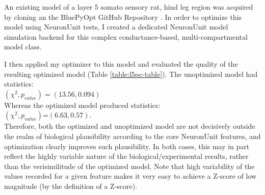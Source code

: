 

An existing model of a layer 5 somato sensory rat, hind leg region was acquired by cloning an the BluePyOpt GitHub Repository \citep{van2016bluepyopt}.
In order to optimize this model using NeuronUnit tests, I created a dedicated NeuronUnit model simulation backend for this complex conductance-based, multi-compartmental model class.

I then applied my optimizer to this model and evaluated the quality of the resulting optimized model (Table \ref{table:l5pc-table}).
The unoptimized model had statistics:\\
$(\chi^{2},p_{value})=(13.56, 0.094)$\\
Whereas the optimized model produced statistics:\\
$(\chi^{2},p_{value})$=$(6.63, 0.57)$.\\
Therefore, both the optimized and unoptimized model are not decisively outside the realm of biological plausibility according to the core NeuronUnit features, and optimization clearly improves such plausibility.
In both cases, this may in part reflect the highly variable nature of the biological/experimental results, rather than the verisimilitude of the optimized model.
Note that high variability of the values recorded for a given feature makes it very easy to achieve a Z-score of low magnitude (by the definition of a Z-score).

